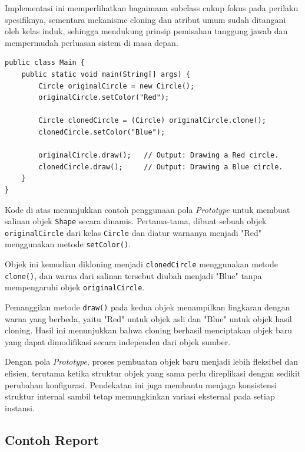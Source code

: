 Implementasi ini memperlihatkan bagaimana subclass cukup fokus pada perilaku spesifiknya, sementara mekanisme cloning dan atribut umum sudah ditangani oleh kelas induk, sehingga mendukung prinsip pemisahan tanggung jawab dan mempermudah perluasan sistem di masa depan.

\begin{lstlisting}[style=JavaStyle, caption={Penggunaan Pola Prototype untuk Mengkloning Shape}, label={lst:prototype-main}]
public class Main {
	public static void main(String[] args) {
		Circle originalCircle = new Circle();
		originalCircle.setColor("Red");
		
		Circle clonedCircle = (Circle) originalCircle.clone();
		clonedCircle.setColor("Blue");
		
		originalCircle.draw();   // Output: Drawing a Red circle.
		clonedCircle.draw();     // Output: Drawing a Blue circle.
	}
}
\end{lstlisting}

Kode di atas menunjukkan contoh penggunaan pola \textit{Prototype} untuk membuat salinan objek \texttt{Shape} secara dinamis. Pertama-tama, dibuat sebuah objek \texttt{originalCircle} dari kelas \texttt{Circle} dan diatur warnanya menjadi "Red" menggunakan metode \texttt{setColor()}. 

Objek ini kemudian dikloning menjadi \texttt{clonedCircle} menggunakan metode \texttt{clone()}, dan warna dari salinan tersebut diubah menjadi "Blue" tanpa mempengaruhi objek \texttt{originalCircle}.

Pemanggilan metode \texttt{draw()} pada kedua objek menampilkan lingkaran dengan warna yang berbeda, yaitu "Red" untuk objek asli dan "Blue" untuk objek hasil cloning. Hasil ini menunjukkan bahwa cloning berhasil menciptakan objek baru yang dapat dimodifikasi secara independen dari objek sumber.

Dengan pola \textit{Prototype}, proses pembuatan objek baru menjadi lebih fleksibel dan efisien, terutama ketika struktur objek yang sama perlu direplikasi dengan sedikit perubahan konfigurasi. Pendekatan ini juga membantu menjaga konsistensi struktur internal sambil tetap memungkinkan variasi eksternal pada setiap instansi.



\subsection{Contoh Report}

